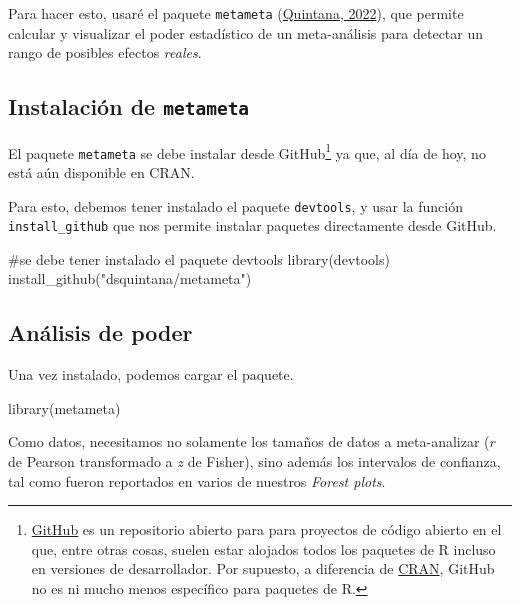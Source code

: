 \documentclass[
  bookmarksnumbered]{article}
\newenvironment{Shaded}{\begin{snugshade}}{\end{snugshade}}
\newcommand{\CommentTok}[1]{\textcolor[rgb]{0.54,0.53,0.53}{#1}}
\newcommand{\FunctionTok}[1]{\textcolor[rgb]{0.39,0.29,0.61}{#1}}
\newcommand{\NormalTok}[1]{\textcolor[rgb]{0.12,0.11,0.11}{#1}}
\newcommand{\StringTok}[1]{\textcolor[rgb]{0.75,0.01,0.01}{#1}}
\begin{document}
Para hacer esto, usaré el paquete \texttt{metameta} (\protect\hyperlink{ref-quintanaMetameta2022}{Quintana, 2022}), que permite calcular y visualizar el poder estadístico de un meta-análisis para detectar un rango de posibles efectos \emph{reales}.

\hypertarget{instalaciuxf3n-de-metameta}{%
\subsection{\texorpdfstring{Instalación de \texttt{metameta}}{Instalación de metameta}}\label{instalaciuxf3n-de-metameta}}

El paquete \texttt{metameta} se debe instalar desde GitHub\footnote{\href{https://github.com/}{GitHub} es un repositorio abierto para para proyectos de código abierto en el que, entre otras cosas, suelen estar alojados todos los paquetes de R incluso en versiones de desarrollador. Por supuesto, a diferencia de \href{https://cran.r-project.org/}{CRAN}, GitHub no es ni mucho menos específico para paquetes de R.} ya que, al día de hoy, no está aún disponible en CRAN.

Para esto, debemos tener instalado el paquete \texttt{devtools}, y usar la función \texttt{install\_github} que nos permite instalar paquetes directamente desde GitHub.

\begin{Shaded}
\begin{Highlighting}[]
\CommentTok{\#se debe tener instalado el paquete devtools}
\FunctionTok{library}\NormalTok{(devtools)}
\FunctionTok{install\_github}\NormalTok{(}\StringTok{"dsquintana/metameta"}\NormalTok{)}
\end{Highlighting}
\end{Shaded}

\hypertarget{anuxe1lisis-de-poder}{%
\subsection{Análisis de poder}\label{anuxe1lisis-de-poder}}

Una vez instalado, podemos cargar el paquete.

\begin{Shaded}
\begin{Highlighting}[]
\FunctionTok{library}\NormalTok{(metameta)}
\end{Highlighting}
\end{Shaded}

Como datos, necesitamos no solamente los tamaños de datos a meta-analizar (\(r\) de Pearson transformado a \emph{z} de Fisher), sino además los intervalos de confianza, tal como fueron reportados en varios de nuestros \emph{Forest plots}.
\end{document}
